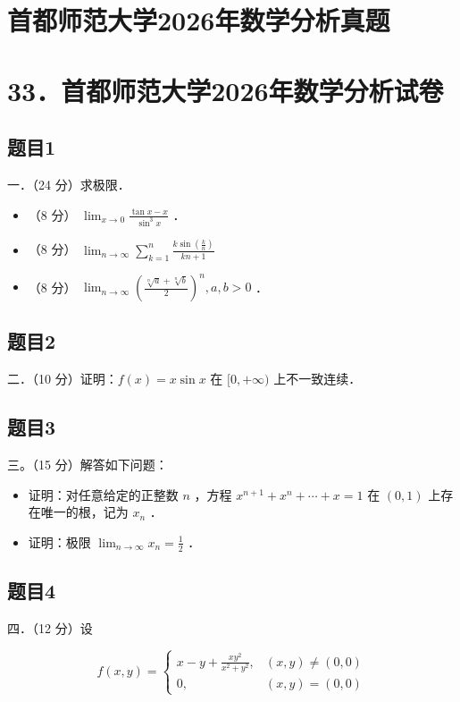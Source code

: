 \documentclass{article}
\begin{document}
\section*{首都师范大学2026年数学分析真题}
\section*{33．首都师范大学2026年数学分析试卷}

\subsection{题目1}
一．（24 分）求极限．

\begin{itemize}
  \item[（1）] （8 分） \(\lim _{x \rightarrow 0} \frac{\tan x-x}{\sin ^{3} x}\) ．
  \item[（2）] （8 分） \(\lim _{n \rightarrow \infty} \sum_{k=1}^{n} \frac{k \sin \left(\frac{k}{n}\right)}{k n+1}\)
  \item[（3）] （8 分） \(\lim _{n \rightarrow \infty}\left(\frac{\sqrt[n]{a}+\sqrt[n]{b}}{2}\right)^{n}, a, b>0\) ．
\end{itemize}

\subsection{题目2}
二．（10 分）证明：\(f(x)=x \sin x\) 在 \([0,+\infty)\) 上不一致连续．

\subsection{题目3}
三。（15 分）解答如下问题：

\begin{itemize}
  \item[（1）] 证明：对任意给定的正整数 \(n\) ，方程 \(x^{n+1}+x^{n}+\cdots+x=1\) 在 \((0,1)\) 上存在唯一的根，记为 \(x_{n}\) ．
  \item[（2）] 证明：极限 \(\lim _{n \rightarrow \infty} x_{n}=\frac{1}{2}\) ．
\end{itemize}

\subsection{题目4}
四．（12 分）设

\[
f(x, y)= \begin{cases}x-y+\frac{x y^{2}}{x^{2}+y^{2}}, & (x, y) \neq(0,0) \\ 0, & (x, y)=(0,0)\end{cases}
\]
\end{document}
